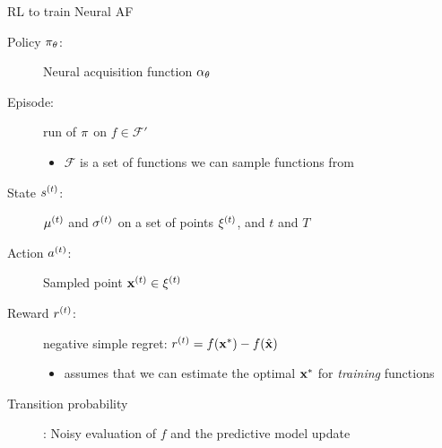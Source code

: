 \begin{frame}[c]{RL to train Neural AF }

\begin{description}
\item[Policy $\pi_\theta$:] Neural acquisition function $\alpha_\theta$
\pause
\item[Episode:] run of $\pi$ on $f\in \mathcal{F}'$
\begin{itemize}
\item $\mathcal{F}$ is a set of functions we can sample functions from
\end{itemize}
\pause
\item[State $s^{(t)} $:] $\mu^{(t)} $ and $\sigma^{(t)} $ on a set of points $\xi^{(t)} $, and $t$ and $T$
\pause
\item[Action $a^{(t)} $:] Sampled point $\mathbf{x}^{(t)}  \in \xi^{(t)} $
\pause
\item[Reward $r^{(t)} $:] negative simple regret: $r^{(t)} = f(\mathbf{x}^*) - f(\hat{\mathbf{x}})$
\begin{itemize}
\item assumes that we can estimate the optimal $\mathbf{x}^*$ for \emph{training} functions
\end{itemize}
\pause
\item[Transition probability]: Noisy evaluation of $f$ and the predictive model update
\end{description}

\end{frame}
